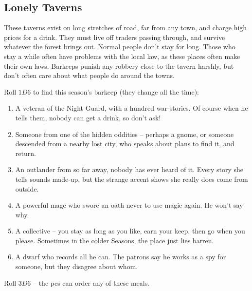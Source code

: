 \begin{multicols}{2}

\subsection{Lonely Taverns}
\label{lonelyTaverns}

These taverns exist on long stretches of road, far from any town, and
charge high prices for a drink. They must live off traders passing
through, and survive whatever the forest brings out. Normal people don't
stay for long. Those who stay a while often have problems with the local
law, as these places often make their own laws. Barkeeps punish any
robbery close to the tavern harshly, but don't often care about what
people do around the towns.


Roll $1D6$ to find this season's barkeep (they change all the time):

\begin{enumerate}
\item
  A veteran of the Night Guard, with a hundred war-stories. Of course
  when he tells them, nobody can get a drink, so don't ask!
\item
  Someone from one of the hidden oddities -- perhaps a gnome, or someone
  descended from a nearby lost city, who speaks about plans to find it, and return.
\item
  An outlander from so far away, nobody has ever heard of it. Every
  story she tells sounds made-up, but the strange accent shows she really
  does come from outside.
\item
  A powerful mage who swore an oath never to use magic again. He won't
  say why.
\item
  A collective -- you stay as long as you like, earn your keep, then go
  when you please. Sometimes in the colder Seasons, the place just lies
  barren.
\item
  A dwarf who records all he can. The patrons say he works as a spy for
  someone, but they disagree about whom.
\end{enumerate}


Roll $3D6$ -- the \glspl{pc} can order any of these meals.


\end{multicols}

